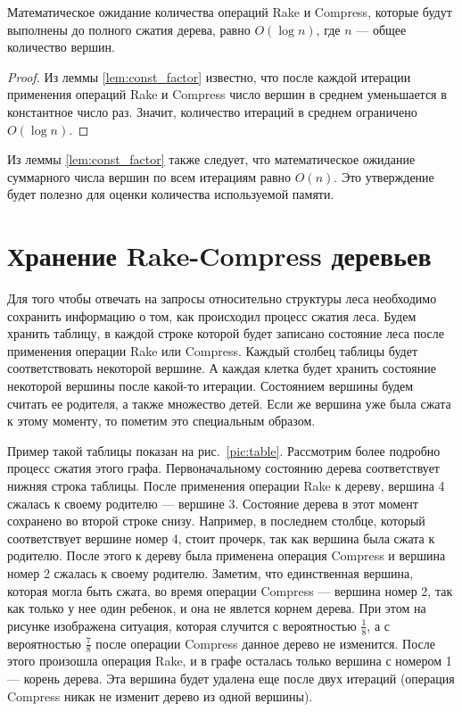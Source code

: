 \begin{theorem}
\label{the:log}
 Математическое ожидание количества операций Rake и Compress, которые будут выполнены до полного сжатия дерева, равно $O(\log n)$, где $n$ --- общее количество вершин. 
\begin{proof}
Из леммы \ref{lem:const_factor} известно, что после каждой итерации применения операций Rake и Compress число вершин в среднем уменьшается в константное число раз. Значит, количество итераций в среднем ограничено $O(\log n)$.
\end{proof}
\end{theorem}

Из леммы \ref{lem:const_factor} также следует, что математическое ожидание суммарного числа вершин по всем итерациям равно $O(n)$. Это утверждение будет полезно для оценки количества используемой памяти.

\FloatBarrier
\section{Хранение Rake-Compress деревьев}
\label{sec:tree_storage}

Для того чтобы отвечать на запросы относительно структуры леса необходимо сохранить информацию о том, как происходил процесс сжатия леса. 
Будем хранить таблицу, в каждой строке которой будет записано состояние леса после применения операции Rake или Compress.
Каждый столбец таблицы будет соответствовать некоторой вершине. 
А каждая клетка будет хранить состояние некоторой вершины после какой-то итерации. Состоянием вершины будем считать ее родителя, а также множество детей. 
Если же вершина уже была сжата к этому моменту, то пометим это специальным образом. 

Пример такой таблицы показан на рис.~\ref{pic:table}. Рассмотрим более подробно процесс сжатия этого графа. 
Первоначальному состоянию дерева соответствует нижняя строка таблицы. После применения операции Rake к дереву, вершина 4 сжалась к своему родителю --- вершине 3.
Состояние дерева в этот момент сохранено во второй строке снизу. Например, в последнем столбце, который соответствует вершине номер 4, стоит прочерк, так как вершина была сжата к родителю.
После этого к дереву была применена операция Compress и вершина номер 2 сжалась к своему родителю. 
Заметим, что единственная вершина, которая могла быть сжата, во время операции Compress --- вершина номер 2, так как только у нее один ребенок, и она не явлется корнем дерева.
При этом на рисунке изображена ситуация, которая случится с вероятностью $\frac{1}{8}$, а с вероятностью $\frac{7}{8}$ после операции Compress данное дерево не изменится.
После этого произошла операция Rake, и в графе осталась только вершина с номером 1 --- корень дерева. 
Эта вершина будет удалена еще после двух итераций (операция Compress никак не изменит дерево из одной вершины).

